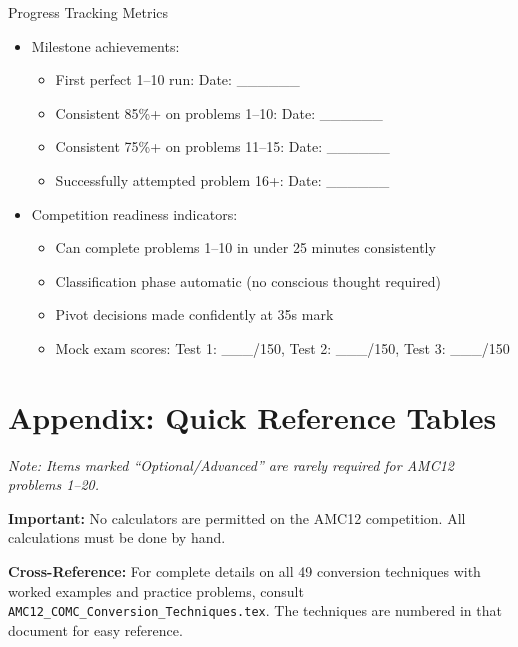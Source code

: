 \documentclass{article}
\begin{document}
\begin{masterybox}{Progress Tracking Metrics}
\begin{itemize}[nosep]
\begin{itemize}[nosep]
  \item[$\square$] Most common technique failures: \_\_\_\_\_\_\_\_\_\_\_\_
  \item[$\square$] Recurring trap patterns fallen for: \_\_\_\_\_\_\_\_\_\_\_\_
  \item[$\square$] Remediation plan created and executed
  \end{itemize}
\item[$\square$] Milestone achievements:
  \begin{itemize}[nosep]
  \item[$\square$] First perfect 1--10 run: Date: \_\_\_\_\_\_
  \item[$\square$] Consistent 85\%+ on problems 1--10: Date: \_\_\_\_\_\_
  \item[$\square$] Consistent 75\%+ on problems 11--15: Date: \_\_\_\_\_\_
  \item[$\square$] Successfully attempted problem 16+: Date: \_\_\_\_\_\_
  \end{itemize}
\item[$\square$] Competition readiness indicators:
  \begin{itemize}[nosep]
  \item[$\square$] Can complete problems 1--10 in under 25 minutes consistently
  \item[$\square$] Classification phase automatic (no conscious thought required)
  \item[$\square$] Pivot decisions made confidently at 35s mark
  \item[$\square$] Mock exam scores: Test 1: \_\_\_/150, Test 2: \_\_\_/150, Test 3: \_\_\_/150
  \end{itemize}
\end{itemize}
\end{masterybox}

\newpage

\section{Appendix: Quick Reference Tables}

\textit{Note: Items marked ``Optional/Advanced'' are rarely required for AMC12 problems 1--20.}

\textbf{Important:} No calculators are permitted on the AMC12 competition. All calculations must be done by hand.

\textbf{Cross-Reference:} For complete details on all 49 conversion techniques with worked examples and practice problems, consult \texttt{AMC12\_COMC\_Conversion\_Techniques.tex}. The techniques are numbered in that document for easy reference.
\end{document}
